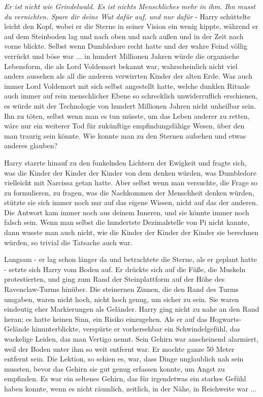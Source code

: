 \emph{Er ist nicht wie Grindelwald. Es ist nichts Menschliches mehr in ihm. Ihn
musst du vernichten. Spare dir deine Wut dafür auf, und nur dafür} - Harry
schüttelte leicht den Kopf, wobei er die Sterne in seiner Vision ein wenig
kippte, während er auf dem Steinboden lag und nach oben und nach außen und in
der Zeit nach vorne blickte. Selbst wenn Dumbledore recht hatte und der wahre
Feind völlig verrückt und böse war ... in hundert Millionen Jahren würde die
organische Lebensform, die als Lord Voldemort bekannt war, wahrscheinlich nicht
viel anders aussehen als all die anderen verwirrten Kinder der alten Erde. Was
auch immer Lord Voldemort mit sich selbst angestellt hatte, welche dunklen
Rituale auch immer auf rein menschlicher Ebene so schrecklich unwiderruflich
erschienen, es würde mit der Technologie von hundert Millionen Jahren nicht
unheilbar sein. Ihn zu töten, selbst wenn man es tun müsste, um das Leben
anderer zu retten, wäre nur ein weiterer Tod für zukünftige empfindungsfähige
Wesen, über den man traurig sein könnte. Wie konnte man zu den Sternen aufsehen
und etwas anderes glauben?

Harry starrte hinauf zu den funkelnden Lichtern der Ewigkeit und fragte sich,
was die Kinder der Kinder der Kinder von dem denken würden, was Dumbledore
vielleicht mit Narcissa getan hatte. Aber selbst wenn man versuchte, die Frage
so zu formulieren, zu fragen, was die Nachkommen der Menschheit denken würden,
stützte sie sich immer noch nur auf das eigene Wissen, nicht auf das der
anderen. Die Antwort kam immer noch aus deinem Inneren, und sie könnte immer
noch falsch sein. Wenn man selbst die hundertste Dezimalstelle von Pi nicht
kannte, dann wusste man auch nicht, wie die Kinder der Kinder der Kinder sie
berechnen würden, so trivial die Tatsache auch war.

Langsam - er lag schon länger da und betrachtete die Sterne, als er geplant
hatte - setzte sich Harry vom Boden auf. Er drückte sich auf die Füße, die
Muskeln protestierten, und ging zum Rand der Steinplattform auf der Höhe des
Ravenclaw-Turms hinüber. Die steinernen Zinnen, die den Rand des Turms umgaben,
waren nicht hoch, nicht hoch genug, um sicher zu sein. Sie waren eindeutig eher
Markierungen als Geländer. Harry ging nicht zu nahe an den Rand heran; es hatte
keinen Sinn, ein Risiko einzugehen. Als er auf das Hogwarts-Gelände
hinunterblickte, verspürte er vorhersehbar ein Schwindelgefühl, das wackelige
Leiden, das man Vertigo nennt. Sein Gehirn war anscheinend alarmiert, weil der
Boden unter ihm so weit entfernt war. Er mochte ganze 50 Meter entfernt sein.
Die Lektion, so schien es, war, dass Dinge unglaublich nah sein mussten, bevor
das Gehirn sie gut genug erfassen konnte, um Angst zu empfinden. Es war ein
seltenes Gehirn, das für irgendetwas ein starkes Gefühl haben konnte, wenn es
nicht räumlich, zeitlich, in der Nähe, in Reichweite war ...

